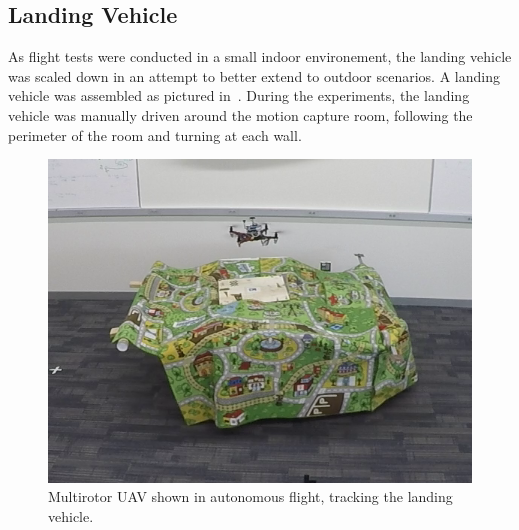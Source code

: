 
\subsection{Landing Vehicle}
As flight tests were conducted in a small indoor environement, the landing
vehicle was scaled down in an attempt to better extend to outdoor scenarios. A
landing vehicle was assembled as pictured in~.
During the experiments, the landing vehicle was manually driven around the
motion capture room, following the perimeter of the room and turning at each
wall.

\begin{figure}
  \centering
  \includegraphics[scale=0.5]{imgs/landing_vehicle.png}
  \caption{Multirotor UAV shown in autonomous flight, tracking the landing
  vehicle.}
  \label{fig:landing_vehicle}
\end{figure}
